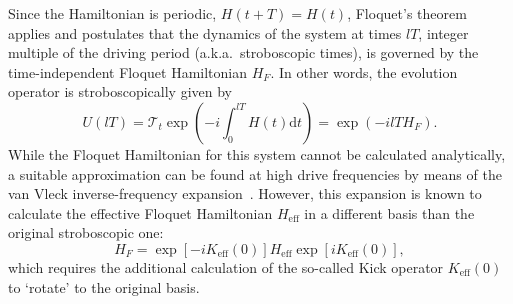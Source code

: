 \documentclass{SciPost}
\newcommand\0{\scalebox{-1}[1]{0}}
\begin{document}
Since the Hamiltonian is periodic, $H(t+T)=H(t)$, Floquet's theorem applies and postulates that the dynamics of the system at times $lT$, integer multiple of the driving period (a.k.a.~stroboscopic times), is governed by the time-independent Floquet Hamiltonian
$H_F$. In other words, the evolution operator is stroboscopically given by
\begin{equation}
U(lT) = \mathcal{T}_t\exp\left(-i\int^{lT}_0H(t)\mathrm{d}t\right) = \exp(-ilT H_F).
\end{equation}
While the Floquet Hamiltonian for this system cannot be calculated analytically, a suitable approximation can be found at high drive frequencies by means of the van Vleck inverse-frequency expansion~\cite{goldman_14,bukov_review}. However, this expansion is known to calculate the effective Floquet Hamiltonian $H_\mathrm{eff}$ in a different basis than the original stroboscopic one: 
\begin{equation*}
H_F = \exp[-i K_\mathrm{eff}(0)] H_\mathrm{eff}\exp[i K_\mathrm{eff}(0)],
\end{equation*}
which requires the additional calculation of the so-called Kick operator $K_\mathrm{eff}(0)$ to `rotate' to the original basis. 
\end{document}
